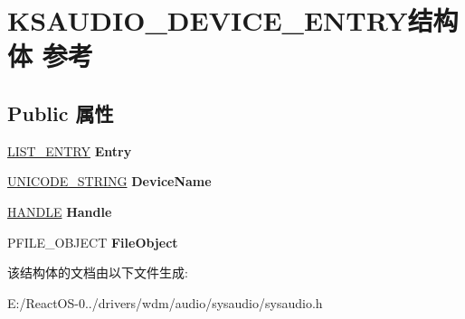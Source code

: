 \hypertarget{struct_k_s_a_u_d_i_o___d_e_v_i_c_e___e_n_t_r_y}{}\section{K\+S\+A\+U\+D\+I\+O\+\_\+\+D\+E\+V\+I\+C\+E\+\_\+\+E\+N\+T\+R\+Y结构体 参考}
\label{struct_k_s_a_u_d_i_o___d_e_v_i_c_e___e_n_t_r_y}
\subsection*{Public 属性}
\begin{DoxyCompactItemize}
\item 
\mbox{\label{struct_k_s_a_u_d_i_o___d_e_v_i_c_e___e_n_t_r_y_aed42d26748a6f600bc6d4d5443628a8d}} 
\hyperlink{struct___l_i_s_t___e_n_t_r_y}{L\+I\+S\+T\+\_\+\+E\+N\+T\+RY} {\bfseries Entry}
\item 
\mbox{\label{struct_k_s_a_u_d_i_o___d_e_v_i_c_e___e_n_t_r_y_ace7dcacbf1b798843bc8902c0355092b}} 
\hyperlink{struct___u_n_i_c_o_d_e___s_t_r_i_n_g}{U\+N\+I\+C\+O\+D\+E\+\_\+\+S\+T\+R\+I\+NG} {\bfseries Device\+Name}
\item 
\mbox{\label{struct_k_s_a_u_d_i_o___d_e_v_i_c_e___e_n_t_r_y_a5ef8afcff7527d8fe195d865a7fd3dff}} 
\hyperlink{interfacevoid}{H\+A\+N\+D\+LE} {\bfseries Handle}
\item 
\mbox{\label{struct_k_s_a_u_d_i_o___d_e_v_i_c_e___e_n_t_r_y_a386eb8a66ac384beff95455580a63aba}} 
P\+F\+I\+L\+E\+\_\+\+O\+B\+J\+E\+CT {\bfseries File\+Object}
\end{DoxyCompactItemize}


该结构体的文档由以下文件生成\+:\begin{DoxyCompactItemize}
\item 
E\+:/\+React\+O\+S-\/0../drivers/wdm/audio/sysaudio/sysaudio.\+h\end{DoxyCompactItemize}
